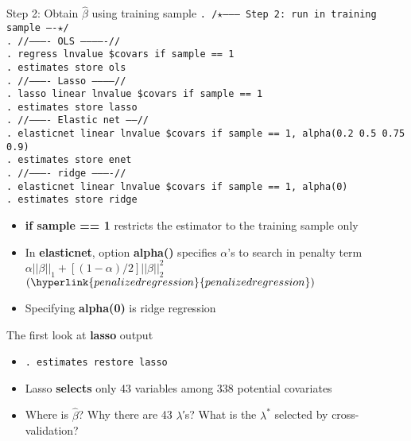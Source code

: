 \documentclass{beamer}
\newcommand{\st}[1]{\small{\texttt{#1}}}
\begin{document}
\begin{frame}{Step 2: Obtain $\hat{\beta}$ using training sample}
	\label{elastic-net example}
 \st{. /$\star$--------- Step 2: run in training sample ----$\star$/}\\
 \st{. //---------- OLS -------------//}\\
 \st{. regress lnvalue \$covars if sample == 1}\\
 \st{. estimates store ols}\\
 \st{. //---------- Lasso -----------//}\\
 \st{. lasso linear lnvalue \$covars if sample == 1}\\
 \st{. estimates store lasso}\\
 \st{. //---------- Elastic net -----//}\\
 \st{. elasticnet linear lnvalue \$covars if sample == 1, alpha(0.2 0.5 0.75 0.9)}\\
 \st{. estimates store enet}\\
 \st{. //---------- ridge ----------//}\\
 \st{. elasticnet linear lnvalue \$covars if sample == 1, alpha(0)}\\
 \st{. estimates store ridge}\\
	\begin{itemize}
		\item \textbf{if sample == 1} restricts the estimator to the training sample only
		\item In \textbf{elasticnet}, option \textbf{alpha()} specifies $\alpha$’s to search in penalty term $\alpha||\beta||_1+[(1-\alpha)/2]||\beta||^2_2$$ (\hyperlink{penalized regression}{penalized regression})$
		\item Specifying \textbf{alpha(0)} is ridge regression
	\end{itemize}
\end{frame}

\begin{frame}{The first look at \textbf{lasso} output}
	\label{lasso}
	\begin{itemize}
		\item [] \small{\texttt{. estimates restore lasso}}
	\end{itemize}
	\begin{itemize}
		\item Lasso \textbf{selects} only {\color{red}43} variables among {\color{red}338} potential covariates \hyperlink{post-selection}{}
		\item Where is $\hat{\beta}$? Why there are 43 $\lambda$′s? What is the $\lambda^*$ selected by cross-validation? \hyperlink{A closer look at lasso}{}
	\end{itemize}
\end{frame}
\end{document}
